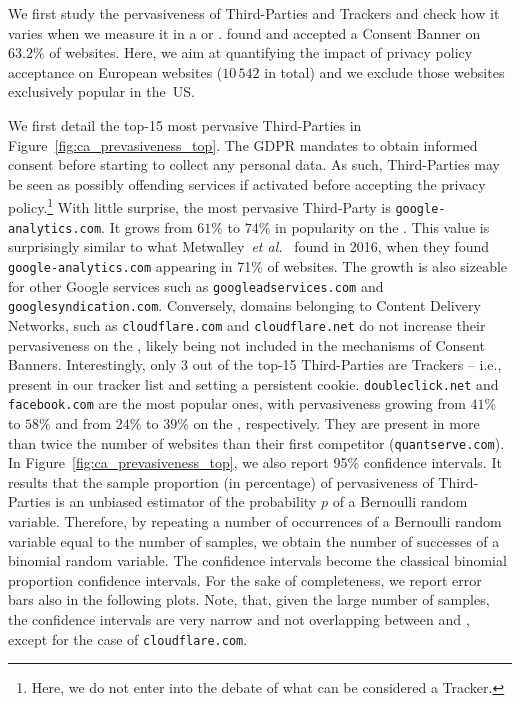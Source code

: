 We first study the pervasiveness of Third-Parties and Trackers and check how it varies when we measure it in a \BEFORE or \AFTER. \TOOL found and accepted a Consent Banner on $63.2\%$ of websites. Here, we aim at quantifying the impact of privacy policy acceptance on European websites ($10\,542$ in total) and we exclude those websites exclusively popular in the~US.

We first detail the top-15 most pervasive Third-Parties in Figure~\ref{fig:ca_prevasiveness_top}. The GDPR mandates to obtain informed consent before starting to collect any personal data. As such, Third-Parties may be seen as possibly offending services if activated before accepting the privacy policy.\footnote{Here, we do not enter into the debate of what can be considered a Tracker.} With little surprise, the most pervasive Third-Party is \texttt{google-analytics.com}. It grows from $61\%$ to $74\%$ in popularity on the \AFTER. This value is surprisingly similar to what Metwalley~\emph{et al.}~\cite{metwalley2016using} found in 2016, when they found \texttt{google-analytics.com} appearing in 71\% of websites. The growth is also sizeable for other Google services such as \texttt{googleadservices.com} and \texttt{googlesyndication.com}. Conversely, domains belonging to Content Delivery Networks, such as \texttt{cloudflare.com} and \texttt{cloudflare.net} do not increase their pervasiveness on the \AFTER, likely being not included in the mechanisms of Consent Banners. Interestingly, only 3 out of the top-15 Third-Parties are Trackers -- i.e., present in our tracker list and setting a persistent cookie. \texttt{doubleclick.net} and \texttt{facebook.com} are the most popular ones, with pervasiveness growing from $41\%$ to $58\%$ and from $24\%$ to $39\%$ on the \AFTER, respectively. They are present in more than twice the number of websites than their first competitor (\texttt{quantserve.com}).
In Figure~\ref{fig:ca_prevasiveness_top}, we also report 95\% confidence intervals. It results that the sample proportion (in percentage) of pervasiveness of Third-Parties is an unbiased estimator of the probability $p$ of a Bernoulli random variable. Therefore, by repeating a number of occurrences of a Bernoulli random variable equal to the number of samples, we obtain the number of successes of a binomial random variable. The confidence intervals become the classical binomial proportion confidence intervals. For the sake of completeness, we report error bars also in the following plots. Note, that, given the large number of samples, the confidence intervals are very narrow and not overlapping between \BEFORE and \AFTER, except for the case of \texttt{cloudflare.com}.


